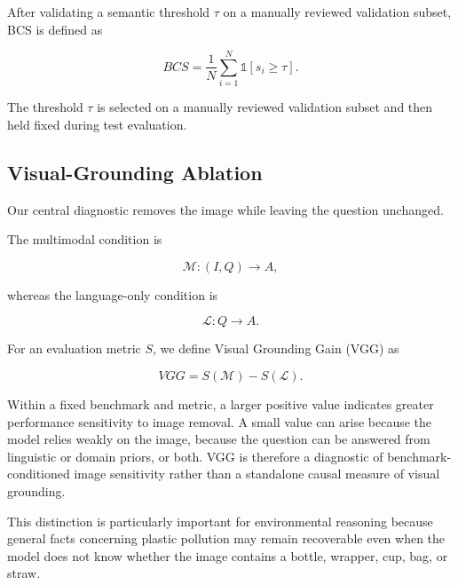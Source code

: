 \documentclass{article}
\begin{document}
After validating a semantic threshold $\tau$ on a manually reviewed validation subset, BCS is defined as

\begin{equation}
BCS
=
\frac{1}{N}
\sum_{i=1}^{N}
\mathbb{1}
\left[
s_i \geq \tau
\right].
\label{eq:bcs}
\end{equation}

The threshold $\tau$ is selected on a manually reviewed validation subset and then held fixed during test evaluation.

\subsection{Visual-Grounding Ablation}
\label{subsec:grounding_ablation}

Our central diagnostic removes the image while leaving the question unchanged.

The multimodal condition is

\begin{equation}
\mathcal{M}:
(I,Q)
\rightarrow
A,
\label{eq:multimodal_condition}
\end{equation}

whereas the language-only condition is

\begin{equation}
\mathcal{L}:
Q
\rightarrow
A.
\label{eq:language_condition}
\end{equation}

For an evaluation metric $S$, we define Visual Grounding Gain (VGG) as

\begin{equation}
VGG
=
S(\mathcal{M})
-
S(\mathcal{L}).
\label{eq:vgg}
\end{equation}

Within a fixed benchmark and metric, a larger positive value indicates greater performance sensitivity to image removal. A small value can arise because the model relies weakly on the image, because the question can be answered from linguistic or domain priors, or both. VGG is therefore a diagnostic of benchmark-conditioned image sensitivity rather than a standalone causal measure of visual grounding.

This distinction is particularly important for environmental reasoning because general facts concerning plastic pollution may remain recoverable even when the model does not know whether the image contains a bottle, wrapper, cup, bag, or straw.
\end{document}
